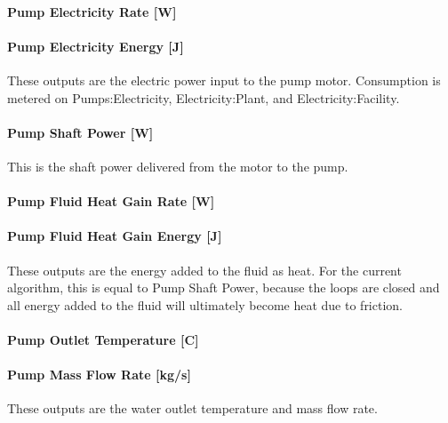 \paragraph{Pump Electricity Rate {[}W{]}}\label{pump-electric-power-w-1}

\paragraph{Pump Electricity Energy {[}J{]}}\label{pump-electric-energy-j-1}

These outputs are the electric power input to the pump motor. Consumption is metered on Pumps:Electricity, Electricity:Plant, and Electricity:Facility.

\paragraph{Pump Shaft Power {[}W{]}}\label{pump-shaft-power-w-1}

This is the shaft power delivered from the motor to the pump.

\paragraph{Pump Fluid Heat Gain Rate {[}W{]}}\label{pump-fluid-heat-gain-rate-w-1}

\paragraph{Pump Fluid Heat Gain Energy {[}J{]}}\label{pump-fluid-heat-gain-energy-j-1}

These outputs are the energy added to the fluid as heat. For the current algorithm, this is equal to Pump Shaft Power, because the loops are closed and all energy added to the fluid will ultimately become heat due to friction.

\paragraph{Pump Outlet Temperature {[}C{]}}\label{pump-outlet-temperature-c-1}

\paragraph{Pump Mass Flow Rate {[}kg/s{]}}\label{pump-mass-flow-rate-kgs-1}

These outputs are the water outlet temperature and mass flow rate.

